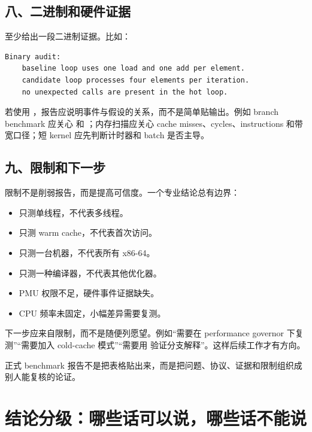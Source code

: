 \subsection{八、二进制和硬件证据}

至少给出一段二进制证据。比如：

\begin{lstlisting}
Binary audit:
    baseline loop uses one load and one add per element.
    candidate loop processes four elements per iteration.
    no unexpected calls are present in the hot loop.
\end{lstlisting}

若使用 ，报告应说明事件与假设的关系，而不是简单贴输出。例如 branch benchmark 应关心  和 ；内存扫描应关心 cache misses、cycles、instructions 和带宽口径；短 kernel 应先判断计时器和 batch 是否主导。

\subsection{九、限制和下一步}

限制不是削弱报告，而是提高可信度。一个专业结论总有边界：

\begin{itemize}
  \item 只测单线程，不代表多线程。
  \item 只测 warm cache，不代表首次访问。
  \item 只测一台机器，不代表所有 x86-64。
  \item 只测一种编译器，不代表其他优化器。
  \item PMU 权限不足，硬件事件证据缺失。
  \item CPU 频率未固定，小幅差异需要复测。
\end{itemize}

下一步应来自限制，而不是随便列愿望。例如“需要在 performance governor 下复测”“需要加入 cold-cache 模式”“需要用  验证分支解释”。这样后续工作才有方向。

\begin{keyidea}
正式 benchmark 报告不是把表格贴出来，而是把问题、协议、证据和限制组织成别人能复核的论证。
\end{keyidea}

\section{结论分级：哪些话可以说，哪些话不能说}

